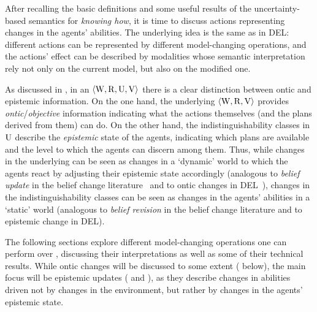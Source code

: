 \begin{textonuevo}
After recalling the basic definitions and some useful results of the uncertainty-based semantics for \emph{knowing how}, it is time to discuss actions representing changes in the agents' abilities. The underlying idea is the same as in DEL: different actions can be represented by different model-changing operations, and the actions' effect can be described by modalities whose semantic interpretation rely not only on the current model, but also on the modified one. 

\medskip

As discussed in \cite{AFSVQ23report}, in an \ults $\langle \operatorname{W},\operatorname{R},\operatorname{U},\operatorname{V} \rangle$ there is a clear distinction between ontic and epistemic information. On the one hand, the underlying \lts $\langle \operatorname{W},\operatorname{R},\operatorname{V} \rangle$ provides \emph{ontic}/\emph{objective} information indicating what the actions themselves (and the plans derived from them) can do. On the other hand, the indistinguishability classes in $\operatorname{U}$ describe the \emph{epistemic} state of the agents, indicating which plans are available and the level to which the agents can discern among them. Thus, while changes in the underlying \lts can be seen as changes in a `dynamic' world to which the agents react by adjusting their epistemic state accordingly (analogous to  \emph{belief update} in the belief change literature~\cite{sep-logic-belief-revision} and to ontic changes in DEL~\cite{vanDitmarschKooi2008}), changes in the indistinguishability classes can be seen as changes in the agents' abilities in a `static' world (analogous to \emph{belief revision} in the belief change literature and to epistemic change in DEL).

\smallskip

The following sections explore different model-changing operations one can perform over \ultss, discussing their interpretations as well as some of their technical results. While ontic changes will be discussed to some extent ( below), the main focus will be epistemic updates ( and ), as they describe changes in abilities driven not by changes in the environment, but rather by changes in the agents' epistemic state.

\end{textonuevo}




